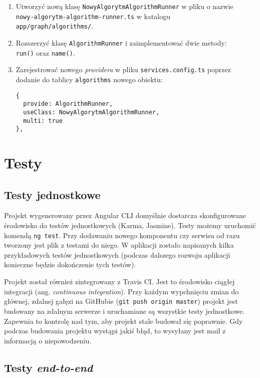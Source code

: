 \begin{enumerate}
\setlength\itemsep{0em}
\item Utworzyć nową klasę \texttt{NowyAlgorytmAlgorithmRunner} w pliku o nazwie \\ \texttt{nowy-algorytm-algorithm-runner.ts} w katalogu \\ \texttt{app/graph/algorithms/}.

\item Rozszerzyć klasę \texttt{AlgorithmRunner} i zaimplementować dwie metody: \\ \texttt{run()} oraz \texttt{name()}.

\item Zarejestrować nowego \textit{providera} w pliku \texttt{services.config.ts} poprzez dodanie do tablicy \texttt{algorithms} nowego obiektu:
\begin{verbatim}
{
  provide: AlgorithmRunner, 
  useClass: NowyAlgorytmAlgorithmRunner, 
  multi: true
},
\end{verbatim}
\end{enumerate}

\section{Testy}\label{sec:tests}

\subsection*{Testy jednostkowe}

Projekt wygenerowany przez Angular CLI domyślnie dostarcza skonfigurowane środowisko do testów jednostkowych (Karma, Jasmine). Testy możemy uruchomić komendą \texttt{ng test}. Przy dodawaniu nowego komponentu czy serwisu od razu tworzony jest plik z testami do niego. W aplikacji zostało napisanych kilka przykładowych testów jednostkowych (podczas dalszego rozwoju aplikacji konieczne będzie dokończenie tych testów).

Projekt został również zintegrowany z Travis CI. Jest to środowisko ciągłej integracji (ang. \textit{continuous integration}). Przy każdym wypchnięciu zmian do głównej, zdalnej gałęzi na GitHubie (\texttt{git push origin master}) projekt jest budowany na zdalnym serwerze i uruchamiane są wszystkie testy jednostkowe. Zapewnia to kontrolę nad tym, aby projekt stale budował się poprawnie. Gdy podczas budowania projektu wystąpi jakiś błąd, to wysyłany jest mail z informacją o niepowodzeniu.

\subsection*{Testy \textit{end-to-end}}

